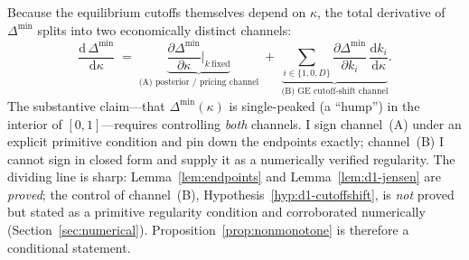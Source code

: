 \documentclass[11pt]{article}
\newcommand{\1}{\mathbf{1}}
\begin{document}
\makeatletter
{}
\makeatother

Because the equilibrium cutoffs themselves depend on $\kappa$, the total
derivative of $\Delta^{\min}$ splits into two economically distinct channels:
\begin{equation}
  \frac{\mathrm{d}\,\Delta^{\min}}{\mathrm{d}\kappa}
  \;=\;
  \underbrace{\frac{\partial \Delta^{\min}}{\partial \kappa}\bigg|_{k\ \text{fixed}}}_{\text{(A) posterior / pricing channel}}
  \;+\;
  \underbrace{\sum_{i\in\{1,0,D\}}\frac{\partial \Delta^{\min}}{\partial k_i}\,\frac{\mathrm{d} k_i}{\mathrm{d}\kappa}}_{\text{(B) GE cutoff-shift channel}}.
  \label{eq:d1-decomp}
\end{equation}
The substantive claim---that $\Delta^{\min}(\kappa)$ is single-peaked (a ``hump'')
in the interior of $[0,1]$---requires controlling \emph{both} channels. I sign
channel~(A) under an explicit primitive condition and pin down the endpoints
exactly; channel~(B) I cannot sign in closed form and supply it as a
numerically verified regularity. The dividing line is sharp:
Lemma~\ref{lem:endpoints} and Lemma~\ref{lem:d1-jensen} are \emph{proved};
the control of channel~(B), Hypothesis~\ref{hyp:d1-cutoffshift}, is \emph{not}
proved but stated as a primitive regularity condition and corroborated
numerically (Section~\ref{sec:numerical}). Proposition~\ref{prop:nonmonotone} is
therefore a conditional statement.
\end{document}
